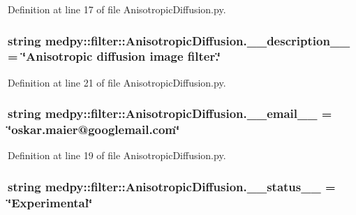 Definition at line 17 of file AnisotropicDiffusion.py.

\hypertarget{namespacemedpy_1_1filter_1_1AnisotropicDiffusion_a97363b241e5808e1609eee07cddb12fa}{
\subsubsection[{\_\-\_\-description\_\-\_\-}]{\setlength{\rightskip}{0pt plus 5cm}string {\bf medpy::filter::AnisotropicDiffusion.\_\-\_\-description\_\-\_\-} = \char`\"{}Anisotropic diffusion image filter.\char`\"{}}}
\label{namespacemedpy_1_1filter_1_1AnisotropicDiffusion_a97363b241e5808e1609eee07cddb12fa}


Definition at line 21 of file AnisotropicDiffusion.py.

\hypertarget{namespacemedpy_1_1filter_1_1AnisotropicDiffusion_a4d14a658be3b72784503acfb1db89fb3}{
\subsubsection[{\_\-\_\-email\_\-\_\-}]{\setlength{\rightskip}{0pt plus 5cm}string {\bf medpy::filter::AnisotropicDiffusion.\_\-\_\-email\_\-\_\-} = \char`\"{}oskar.maier@googlemail.com\char`\"{}}}
\label{namespacemedpy_1_1filter_1_1AnisotropicDiffusion_a4d14a658be3b72784503acfb1db89fb3}


Definition at line 19 of file AnisotropicDiffusion.py.

\hypertarget{namespacemedpy_1_1filter_1_1AnisotropicDiffusion_ad9fcbb3bdb2cd4b52a9222ea58797167}{
\subsubsection[{\_\-\_\-status\_\-\_\-}]{\setlength{\rightskip}{0pt plus 5cm}string {\bf medpy::filter::AnisotropicDiffusion.\_\-\_\-status\_\-\_\-} = \char`\"{}Experimental\char`\"{}}}
\label{namespacemedpy_1_1filter_1_1AnisotropicDiffusion_ad9fcbb3bdb2cd4b52a9222ea58797167}


